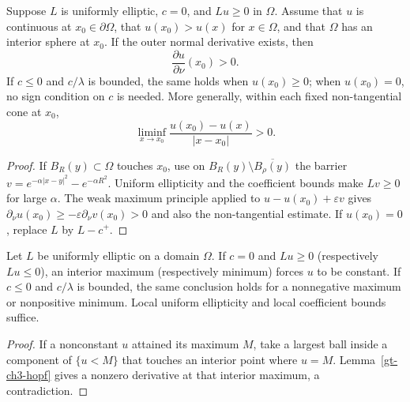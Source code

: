 \begin{lemma}\label{gt-ch3-hopf}
Suppose $L$ is uniformly elliptic, $c=0$, and $Lu\geq0$ in $\Omega$.
Assume that $u$ is continuous at $x_0\in\partial\Omega$, that
$u(x_0)>u(x)$ for $x\in\Omega$, and that $\Omega$ has an interior sphere at
$x_0$. If the outer normal derivative exists, then
\begin{equation}
\tag{3.10}
\frac{\partial u}{\partial\nu}(x_0)>0.
\end{equation}
If $c\leq0$ and $c/\lambda$ is bounded, the same holds when $u(x_0)\geq0$;
when $u(x_0)=0$, no sign condition on $c$ is needed. More generally, within
each fixed non-tangential cone at $x_0$,
\begin{equation}
\tag{3.11}
\liminf_{x\to x_0}
\frac{u(x_0)-u(x)}{|x-x_0|}>0.
\end{equation}
\end{lemma}
\begin{proof}
\sketch If $B_R(y)\subset\Omega$ touches $x_0$, use on
$B_R(y)\setminus\overline{B_\rho(y)}$ the barrier
$v=e^{-\alpha|x-y|^2}-e^{-\alpha R^2}$. Uniform ellipticity and the
coefficient bounds make $Lv\geq0$ for large $\alpha$. The weak maximum
principle applied to $u-u(x_0)+\varepsilon v$ gives
$\partial_\nu u(x_0)\geq-\varepsilon\partial_\nu v(x_0)>0$ and also the
non-tangential estimate. If $u(x_0)=0$, replace $L$ by $L-c^+$.
\end{proof}

\begin{theorem}\label{gt-ch3-smp}
Let $L$ be uniformly elliptic on a domain $\Omega$.
If $c=0$ and $Lu\geq0$ (respectively $Lu\leq0$), an interior maximum
(respectively minimum) forces $u$ to be constant. If $c\leq0$ and
$c/\lambda$ is bounded, the same conclusion holds for a nonnegative maximum
or nonpositive minimum. Local uniform ellipticity and local coefficient
bounds suffice.
\end{theorem}
\begin{proof}
\sketch If a nonconstant $u$ attained its maximum $M$, take a largest ball
inside a component of $\{u<M\}$ that touches an interior point where $u=M$.
Lemma~\ref{gt-ch3-hopf} gives a nonzero derivative at that interior maximum,
a contradiction.
\end{proof}

